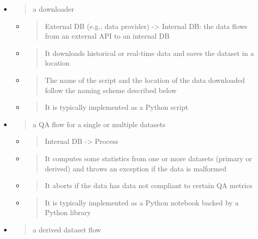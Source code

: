 \documentclass[11pt, reqno]{amsart}
\begin{document}
\begin{itemize}
\item
  \begin{quote}
  a downloader
  \end{quote}

  \begin{itemize}
  \item
    \begin{quote}
    External DB (e.g., data provider) -\textgreater{} Internal DB: the
    data flows from an external API to an internal DB
    \end{quote}
  \item
    \begin{quote}
    It downloads historical or real-time data and saves the dataset in a
    location
    \end{quote}
  \item
    \begin{quote}
    The name of the script and the location of the data downloaded
    follow the naming scheme described below
    \end{quote}
  \item
    \begin{quote}
    It is typically implemented as a Python script
    \end{quote}
  \end{itemize}
\item
  \begin{quote}
  a QA flow for a single or multiple datasets
  \end{quote}

  \begin{itemize}
  \item
    \begin{quote}
    Internal DB -\textgreater{} Process
    \end{quote}
  \item
    \begin{quote}
    It computes some statistics from one or more datasets (primary or
    derived) and throws an exception if the data is malformed
    \end{quote}
  \item
    \begin{quote}
    It aborts if the data has data not compliant to certain QA metrics
    \end{quote}
  \item
    \begin{quote}
    It is typically implemented as a Python notebook backed by a Python
    library
    \end{quote}
  \end{itemize}
\item
  \begin{quote}
  a derived dataset flow
  \end{quote}


\end{itemize}
\end{document}
